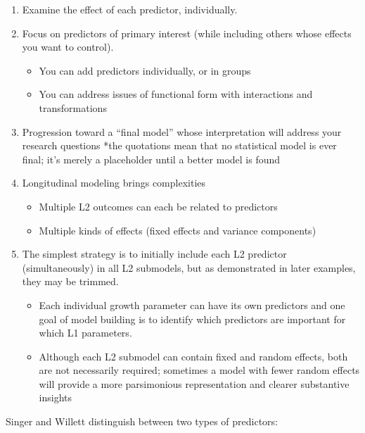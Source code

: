\documentclass[
  english,
]{book}
\providecommand{\tightlist}{%
  \setlength{\itemsep}{0pt}\setlength{\parskip}{0pt}}
\begin{document}
\begin{enumerate}
\def\labelenumi{\arabic{enumi}.}
\tightlist
\item
  Examine the effect of each predictor, individually.
\item
  Focus on predictors of primary interest (while including others whose effects you want to control).

  \begin{itemize}
  \tightlist
  \item
    You can add predictors individually, or in groups
  \item
    You can address issues of functional form with interactions and transformations
  \end{itemize}
\item
  Progression toward a ``final model'' whose interpretation will address your research questions
  *the quotations mean that no statistical model is ever final; it's merely a placeholder until a better model is found
\item
  Longitudinal modeling brings complexities

  \begin{itemize}
  \tightlist
  \item
    Multiple L2 outcomes can each be related to predictors
  \item
    Multiple kinds of effects (fixed effects and variance components)
  \end{itemize}
\item
  The simplest strategy is to initially include each L2 predictor (simultaneously) in all L2 submodels, but as demonstrated in later examples, they may be trimmed.

  \begin{itemize}
  \tightlist
  \item
    Each individual growth parameter can have its own predictors and one goal of model building is to identify which predictors are important for which L1 parameters.
  \item
    Although each L2 submodel can contain fixed and random effects, both are not necessarily required; sometimes a model with fewer random effects will provide a more parsimonious representation and clearer substantive insights
  \end{itemize}
\end{enumerate}

Singer and Willett \citeyearpar{singer_applied_2003} distinguish between two types of predictors:
\end{document}
